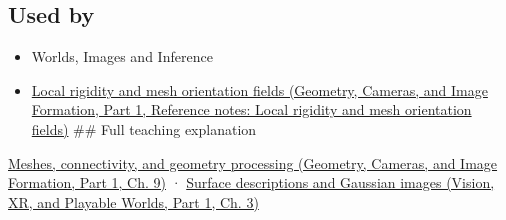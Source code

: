 \subsection{Used by}\label{appendix-0234ab7f86b1-used-by}

\hypertarget{appendix-0234ab7f86b1-used-by}{}

\begin{itemize}
\item
  {Worlds, Images and Inference}
\item
  \href{../03-Geometry-Cameras-and-Image-Formation-P01/main.pdf\#appendix-7107009c505b}{Local rigidity and mesh orientation fields (Geometry, Cameras, and Image Formation, Part 1, Reference notes: Local rigidity and mesh orientation fields)} \#\# Full teaching explanation
\end{itemize}

\href{../03-Geometry-Cameras-and-Image-Formation-P01/main.pdf\#03-visual-computing-i-ch002-meshes-connectivity-and-geometry-processing}{Meshes, connectivity, and geometry processing (Geometry, Cameras, and Image Formation, Part 1, Ch. 9)} · \href{../07-Vision-XR-and-Playable-Worlds-P01/main.pdf\#04-visual-computing-ii-ch032-surface-descriptions-and-gaussian-images}{Surface descriptions and Gaussian images (Vision, XR, and Playable Worlds, Part 1, Ch. 3)}
